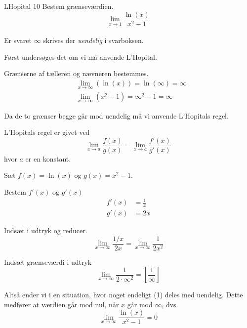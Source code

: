 \documentclass{article}
\begin{document}
\begin{exercise}{LHopital 10}
	Bestem grænseværdien.
	\[
	\lim_{x \to 1} \frac{\ln(x)}{x^2-1}
	\] 
	\\
	Er svaret $\infty$ skrives der \emph{uendelig} i svarboksen.
	
	
	\hint
	Først undersøges det om vi må anvende L'Hopital.
	
	\hint
	Grænserne af tælleren og nævneren bestemmes.
	\begin{align*}
		&\lim_{x \to \infty} (\ln(x)) = \ln(\infty) = \infty \\
		&\lim_{x \to \infty} (x^2 - 1) = \infty^2 - 1 = \infty
	\end{align*}
	
	\hint
	Da de to grænser begge går mod uendelig må vi  anvende L'Hopitals regel. 
	
	\hint
	L'Hopitals regel er givet ved
	\[
	\lim_{x \to a} \frac{f(x)}{g(x)} = \lim_{x \to a} \frac{f'(x)}{g'(x)} 
	\]
	hvor $a$  er en konstant.
	
	\hint
	Sæt $f(x) = \ln(x)$ og $g(x) = x^2-1$. 
	
	\hint
	Bestem $f'(x)$ og $g'(x)$
	\begin{align*}
		f'(x) &= \frac{1}{x} \\
		g'(x) &= 2x
	\end{align*}
	
	\hint
	Indsæt i udtryk og reducer. 
	\[
	\lim_{x \to \infty} \frac{1/x}{2x} = \lim_{x \to \infty} \frac{1}{2x^2} 
	\]
	
	\hint
	Indsæt grænseværdi i udtryk
	\[
	\lim_{x \to \infty} \frac{1}{2 \cdot \infty^2}  = \left[ \frac{1}{\infty}  \right] 
	\]
	
	\hint
	Altså ender vi i en situation, hvor noget endeligt (1) deles med uendelig. Dette medfører at værdien går mod nul, når $x$ går mod $\infty$, dvs.
	\[
	\lim_{x \to \infty} \frac{\ln(x)}{x^2 - 1} = 0
	\]

	
\end{exercise}
\end{document}
